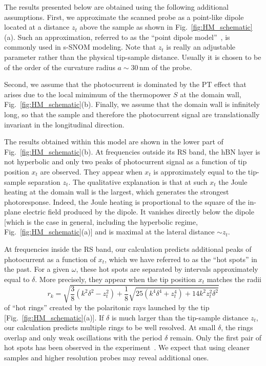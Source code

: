 \documentclass[aps, prb, reprint, superscriptaddress]{revtex4-2}
\newcommand{\unit}[1]{\,\mathrm{#1}} %
\begin{document}
The results presented below are obtained using the following additional assumptions. First, we approximate the scanned probe as a point-like dipole located at a distance $z_t$ above the sample as shown in  Fig.~\ref{fig:HM_schematic}(a). 
Such an approximation, referred to as the ``point dipole model''~\cite{Keilmann2004, Cvitkovic2007}, is commonly used in s-SNOM modeling.
Note that $z_t$ is really an adjustable parameter rather than the physical tip-sample distance. Usually it is chosen to be of the order of the curvature radius $a \sim 30\unit{nm}$ of the probe.

Second, we assume that the photocurrent is dominated by the PT effect that arises due to the local mimimum of the thermopower $S$ at the domain wall,
Fig.~\ref{fig:HM_schematic}(b). Finally, we assume that
the domain wall is infinitely long, so that the sample and therefore the photocurrent signal are translationally invariant in the longitudinal direction. 

The results obtained within this model are shown in the lower part of Fig.~\ref{fig:HM_schematic}(b).
At frequencies outside its RS band, the hBN layer is not hyperbolic and only two peaks
of photocurrent signal as a function of tip position $x_t$ are observed.
They appear when $x_t$ is approximately equal to the tip-sample separation $z_t$. 
The qualitative explanation is that at such $x_t$ the Joule heating at the domain wall is the largest,
which generates the strongest photoresponse.
Indeed, the Joule heating is proportional to the square of the in-plane electric field produced by the dipole. It vanishes directly below the dipole [which is the case in general, including the hyperbolic regime, Fig.~\ref{fig:HM_schematic}(a)] and is maximal at the lateral distance $\sim z_t$.

At frequencies inside the RS band, our calculation predicts
additional peaks of photocurrent as a function of $x_t$, which we have referred to as the ``hot spots'' in the past.
For a given $\omega$, these hot spots are separated by intervals approximately equal to $\delta$.
More precisely, they appear when the tip position $x_t$ matches the radii
\begin{equation}
	r_k = \sqrt{\frac{3}{8}(k^2 \delta^2 - z_t^2) + \frac{1}{8}\sqrt{25(k^4 \delta^4 + z_t^4) + 14 k^2 z_t^2 \delta^2}}
	\label{eqn:r_n}
\end{equation}
of ``hot rings'' created by the polaritonic rays launched by the tip [Fig.~\ref{fig:HM_schematic}(a)].
If $\delta$ is much larger than the tip-sample distance $z_t$,
our calculation predicts multiple rings to be well resolved.
At small $\delta$, the rings overlap and only weak oscillations with the period $\delta$ remain.
Only the first pair of hot spots has been observed in the experiment~\cite{Sunku2020a}. 
We expect that using cleaner samples and higher resolution probes may reveal additional ones.
\end{document}
